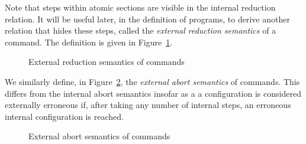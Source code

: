 \documentclass[11pt]{report}
\begin{document}
Note that steps within atomic sections are visible in the internal reduction relation. It will be useful later, in the definition of programs, to derive another relation that hides these steps, called the \emph{external reduction semantics} of a command. The definition is given in Figure~\ref{fig:comm-ext-red-rel}. 

\begin{figure}[h]
	\centering

	
	\vspace{1em}

	
	\vspace{1em}

	
	\vspace{1em}

	\caption{External reduction semantics of commands}
	\label{fig:comm-ext-red-rel}
\end{figure}

We similarly define, in Figure~\ref{fig:comm-ext-abort-rel}, the \emph{external abort semantics} of commands. This differs from the internal abort semantics insofar as a a configuration is considered externally erroneous if, after taking any number of internal steps, an erroneous internal configuration is reached. 

\begin{figure}[h]
	\centering

	
	\vspace{1em}

	
	\vspace{1em}

	
	\vspace{1em}

	\caption{External abort semantics of commands}
	\label{fig:comm-ext-abort-rel}
\end{figure}
\end{document}
